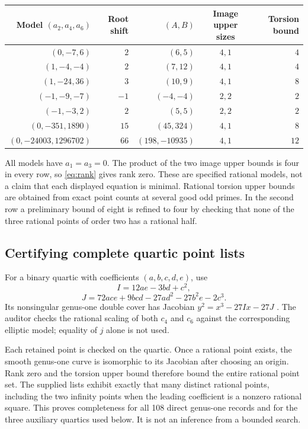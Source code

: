 \documentclass[11pt]{article}
\theoremstyle{remark}\newtheorem{remark}[theorem]{Remark}
\begin{document}
\begin{center}
\small\renewcommand{\arraystretch}{1.16}\setlength{\tabcolsep}{5pt}
\begin{tabular}{rrrcr}
\toprule
Model $(a_2,a_4,a_6)$ & Root shift & $(A,B)$ & Image upper sizes & Torsion bound\\
\midrule
$(0,-7,6)$ & $2$ & $(6,5)$ & $4,1$ & $4$\\
$(1,-4,-4)$ & $2$ & $(7,12)$ & $4,1$ & $4$\\
$(1,-24,36)$ & $3$ & $(10,9)$ & $4,1$ & $8$\\
$(-1,-9,-7)$ & $-1$ & $(-4,-4)$ & $2,2$ & $2$\\
$(-1,-3,2)$ & $2$ & $(5,5)$ & $2,2$ & $2$\\
$(0,-351,1890)$ & $15$ & $(45,324)$ & $4,1$ & $8$\\
$(0,-24003,1296702)$ & $66$ & $(198,-10935)$ & $4,1$ & $12$\\
\bottomrule
\end{tabular}
\end{center}
All models have $a_1=a_3=0$. The product of the two image upper bounds is four in every row, so \eqref{eq:rank} gives rank zero. These are specified rational models, not a claim that each displayed equation is minimal. Rational torsion upper bounds are obtained from exact point counts at several good odd primes. In the second row a preliminary bound of eight is refined to four by checking that none of the three rational points of order two has a rational half.

\subsection{Certifying complete quartic point lists}
For a binary quartic with coefficients $(a,b,c,d,e)$, use
\[
I=12ae-3bd+c^2,
\]
\[
J=72ace+9bcd-27ad^2-27b^2e-2c^3.
\]
Its nonsingular genus-one double cover has Jacobian $y^2=x^3-27Ix-27J$ \cite[Section 2]{Fisher}. The auditor checks the rational scaling of both $c_4$ and $c_6$ against the corresponding elliptic model; equality of $j$ alone is not used.

Each retained point is checked on the quartic. Once a rational point exists, the smooth genus-one curve is isomorphic to its Jacobian after choosing an origin. Rank zero and the torsion upper bound therefore bound the entire rational point set. The supplied lists exhibit exactly that many distinct rational points, including the two infinity points when the leading coefficient is a nonzero rational square. This proves completeness for all 108 direct genus-one records and for the three auxiliary quartics used below. It is not an inference from a bounded search.
\end{document}
